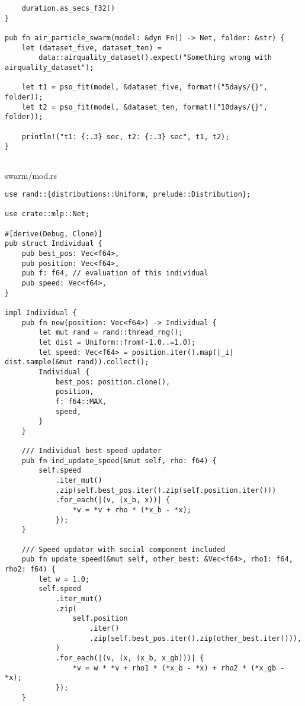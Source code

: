 \begin{code}
\begin{verbatim}
    duration.as_secs_f32()
}

pub fn air_particle_swarm(model: &dyn Fn() -> Net, folder: &str) {
    let (dataset_five, dataset_ten) =
        data::airquality_dataset().expect("Something wrong with airquality_dataset");

    let t1 = pso_fit(model, &dataset_five, format!("5days/{}", folder));
    let t2 = pso_fit(model, &dataset_ten, format!("10days/{}", folder));

    println!("t1: {:.3} sec, t2: {:.3} sec", t1, t2);
}


\end{verbatim}
\end{code}

\begin{code}
\caption{swarm/mod.rs}
\label{src:swarm}
\begin{verbatim} 
use rand::{distributions::Uniform, prelude::Distribution};

use crate::mlp::Net;

#[derive(Debug, Clone)]
pub struct Individual {
    pub best_pos: Vec<f64>,
    pub position: Vec<f64>,
    pub f: f64, // evaluation of this individual
    pub speed: Vec<f64>,
}

impl Individual {
    pub fn new(position: Vec<f64>) -> Individual {
        let mut rand = rand::thread_rng();
        let dist = Uniform::from(-1.0..=1.0);
        let speed: Vec<f64> = position.iter().map(|_i| dist.sample(&mut rand)).collect();
        Individual {
            best_pos: position.clone(),
            position,
            f: f64::MAX,
            speed,
        }
    }

    /// Individual best speed updater
    pub fn ind_update_speed(&mut self, rho: f64) {
        self.speed
            .iter_mut()
            .zip(self.best_pos.iter().zip(self.position.iter()))
            .for_each(|(v, (x_b, x))| {
                *v = *v + rho * (*x_b - *x);
            });
    }

    /// Speed updator with social component included
    pub fn update_speed(&mut self, other_best: &Vec<f64>, rho1: f64, rho2: f64) {
        let w = 1.0;
        self.speed
            .iter_mut()
            .zip(
                self.position
                    .iter()
                    .zip(self.best_pos.iter().zip(other_best.iter())),
            )
            .for_each(|(v, (x, (x_b, x_gb)))| {
                *v = w * *v + rho1 * (*x_b - *x) + rho2 * (*x_gb - *x);
            });
    }


\end{verbatim}
\end{code}
